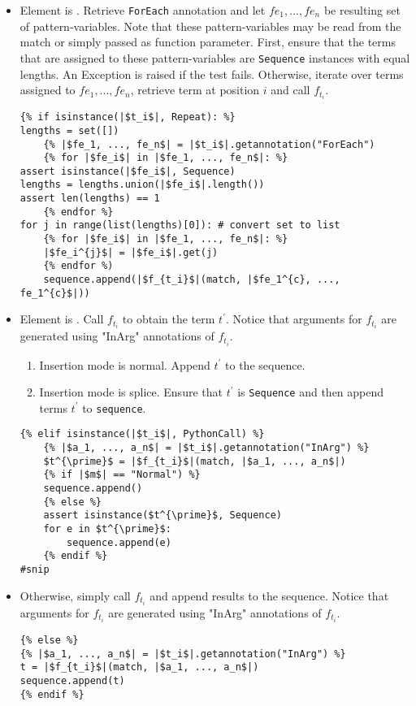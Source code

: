 \begin{itemize}
\item
Element is \TermRepeat. Retrieve \texttt{ForEach} annotation and let $fe_1, ..., fe_n$ be resulting set of pattern-variables. Note that these pattern-variables may be read from the match or simply passed as function parameter. First, ensure that the terms that are assigned to these pattern-variables are \texttt{Sequence} instances with equal lengths. An Exception is raised if the test fails. Otherwise, iterate over terms assigned to $fe_1, ..., fe_n$, retrieve term at position $i$ and call $f_{t_i}$.

\begin{verbatim}
{% if isinstance(|$t_i$|, Repeat): %}
lengths = set([])
	{% |$fe_1, ..., fe_n$| = |$t_i$|.getannotation("ForEach")
	{% for |$fe_i$| in |$fe_1, ..., fe_n$|: %}
assert isinstance(|$fe_i$|, Sequence)
lengths = lengths.union(|$fe_i$|.length())
assert len(lengths) == 1
	{% endfor %}
for j in range(list(lengths)[0]): # convert set to list 
	{% for |$fe_i$| in |$fe_1, ..., fe_n$|: %}
	|$fe_i^{j}$| = |$fe_i$|.get(j)
	{% endfor %)
	sequence.append(|$f_{t_i}$|(match, |$fe_1^{c}, ..., fe_1^{c}$|))
\end{verbatim}
\item
Element is \PythonCall. Call $f_{t_i}$ to obtain the term $t^{\prime}$. Notice that arguments for $f_{t_i}$ are generated using "InArg" annotations of $f_{t_i}$. 
	\begin{enumerate}
	\item Insertion mode is normal. Append $t^{\prime}$ to the sequence.
	\item Insertion mode is splice. Ensure that $t^{\prime}$ is \texttt{Sequence} and then append terms $t^{\prime}$ to \texttt{sequence}.
	\end{enumerate}

\begin{verbatim}
{% elif isinstance(|$t_i$|, PythonCall) %}
	{% |$a_1, ..., a_n$| = |$t_i$|.getannotation("InArg") %}
	$t^{\prime}$ = |$f_{t_i}$|(match, |$a_1, ..., a_n$|)
	{% if |$m$| == "Normal") %}
	sequence.append()
	{% else %}
	assert isinstance($t^{\prime}$, Sequence)
	for e in $t^{\prime}$:
		sequence.append(e)
	{% endif %}
#snip
\end{verbatim}

\item Otherwise, simply call $f_{t_i}$ and append results to the sequence. Notice that arguments for $f_{t_i}$ are generated using "InArg" annotations of $f_{t_i}$. 

\begin{verbatim}
{% else %}
{% |$a_1, ..., a_n$| = |$t_i$|.getannotation("InArg") %}
t = |$f_{t_i}$|(match, |$a_1, ..., a_n$|)
sequence.append(t)
{% endif %}
\end{verbatim}
\end{itemize}

